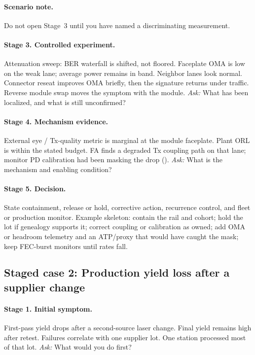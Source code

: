 \paragraph{Scenario note.}
Do not open Stage~3 until you have named a discriminating measurement.

\paragraph{Stage 3. Controlled experiment.}
Attenuation sweep: BER waterfall is shifted, not floored. Faceplate OMA is
low on the weak lane; average power remains in band. Neighbor lanes look
normal. Connector reseat improves OMA briefly, then the signature returns under
traffic. Reverse module swap moves the symptom with the module.
\textit{Ask:} What has been localized, and what is still unconfirmed?

\paragraph{Stage 4. Mechanism evidence.}
External eye / Tx-quality metric is marginal at the module faceplate. Plant
ORL is within the stated budget. FA finds a degraded Tx coupling path on that
lane; monitor PD calibration had been masking the drop
().
\textit{Ask:} What is the mechanism and enabling condition?

\paragraph{Stage 5. Decision.}
State containment, release or hold, corrective action, recurrence control, and
fleet or production monitor. Example skeleton: contain the rail and cohort;
hold the lot if genealogy supports it; correct coupling or calibration as
owned; add OMA or headroom telemetry and an ATP/proxy that would have caught
the mask; keep FEC-burst monitors until rates fall.

\subsection{Staged case 2: Production yield loss after a supplier change}
\label{sec:case-staged-yield}

\paragraph{Stage 1. Initial symptom.}
First-pass yield drops after a second-source laser change. Final yield remains
high after retest. Failures correlate with one supplier lot. One station
processed most of that lot.
\textit{Ask:} What would you do first?

